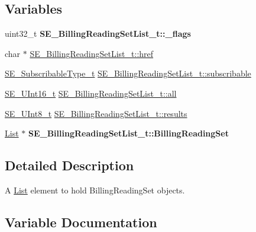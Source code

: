 \subsection*{Variables}
\begin{DoxyCompactItemize}
\item 
\mbox{\label{group__BillingReadingSetList_gacb7a50371aee30e079197f6d67665582}} 
uint32\+\_\+t {\bfseries S\+E\+\_\+\+Billing\+Reading\+Set\+List\+\_\+t\+::\+\_\+flags}
\item 
char $\ast$ \hyperlink{group__BillingReadingSetList_ga517a08d060d1767f0171f645def9e00d}{S\+E\+\_\+\+Billing\+Reading\+Set\+List\+\_\+t\+::href}
\item 
\hyperlink{group__SubscribableType_ga5c41f553d369710ed34619266bf2551e}{S\+E\+\_\+\+Subscribable\+Type\+\_\+t} \hyperlink{group__BillingReadingSetList_gaf43e69532d7afb41951cec8451b82e46}{S\+E\+\_\+\+Billing\+Reading\+Set\+List\+\_\+t\+::subscribable}
\item 
\hyperlink{group__UInt16_gac68d541f189538bfd30cfaa712d20d29}{S\+E\+\_\+\+U\+Int16\+\_\+t} \hyperlink{group__BillingReadingSetList_ga9d555f915ee1b7c518fbe648a623ab55}{S\+E\+\_\+\+Billing\+Reading\+Set\+List\+\_\+t\+::all}
\item 
\hyperlink{group__UInt8_gaf7c365a1acfe204e3a67c16ed44572f5}{S\+E\+\_\+\+U\+Int8\+\_\+t} \hyperlink{group__BillingReadingSetList_ga9e175aeff78de11da028b57ed27c610b}{S\+E\+\_\+\+Billing\+Reading\+Set\+List\+\_\+t\+::results}
\item 
\mbox{\label{group__BillingReadingSetList_ga7fbe3572d38bf2a669e5fa962df88ab6}} 
\hyperlink{structList}{List} $\ast$ {\bfseries S\+E\+\_\+\+Billing\+Reading\+Set\+List\+\_\+t\+::\+Billing\+Reading\+Set}
\end{DoxyCompactItemize}


\subsection{Detailed Description}
A \hyperlink{structList}{List} element to hold Billing\+Reading\+Set objects. 

\subsection{Variable Documentation}
\mbox{\label{group__BillingReadingSetList_ga9d555f915ee1b7c518fbe648a623ab55}} 
